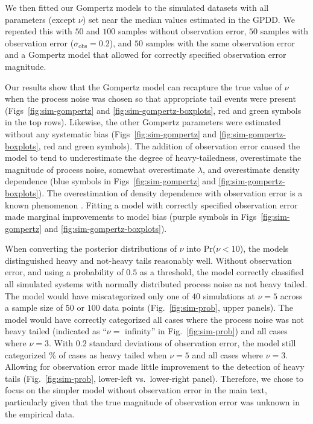 We then fitted our Gompertz models to the simulated datasets with all parameters (except $\nu$) set near the median values estimated in the GPDD. We repeated this with $50$ and $100$ samples without observation error, $50$ samples with observation error ($\sigma_\mathrm{obs} = 0.2$), and $50$ samples with the same observation error and a Gompertz model that allowed for correctly specified observation error magnitude.

Our results show that the Gompertz model can recapture the true value of $\nu$ when the process noise was chosen so that appropriate tail events were present (Figs~\ref{fig:sim-gompertz} and \ref{fig:sim-gompertz-boxplots}, red and green symbols in the top rows). Likewise, the other Gompertz parameters were estimated without any systematic bias (Figs~\ref{fig:sim-gompertz} and \ref{fig:sim-gompertz-boxplots}, red and green symbols). The addition of observation error caused the model to tend to underestimate the degree of heavy-tailedness, overestimate the magnitude of process noise, somewhat overestimate $\lambda$, and overestimate density dependence (blue symbols in Figs~\ref{fig:sim-gompertz} and \ref{fig:sim-gompertz-boxplots}). The overestimation of density dependence with observation error is a known phenomenon \citep{knape2012}. Fitting a model with correctly specified observation error made marginal improvements to model bias (purple symbols in Figs~\ref{fig:sim-gompertz} and \ref{fig:sim-gompertz-boxplots}).

When converting the posterior distributions of $\nu$ into Pr($\nu < 10$), the models distinguished heavy and not-heavy tails reasonably well. Without observation error, and using a probability of $0.5$ as a threshold, the model correctly classified all simulated systems with normally distributed process noise as not heavy tailed. The model would have miscategorized only one of $40$ simulations at $\nu = 5$ across a sample size of $50$ or $100$ data points (Fig.~\ref{fig:sim-prob}, upper panels). The model would have correctly categorized all cases where the process noise was not heavy tailed (indicated as ``$\nu =$ infinity'' in Fig.~\ref{fig:sim-prob}) and all cases where $\nu = 3$. With $0.2$ standard deviations of observation error, the model still categorized \obsErrorNuFivePerc\% of cases as heavy tailed when $\nu = 5$ and all cases where $\nu = 3$. Allowing for observation error made little improvement to the detection of heavy tails (Fig.~\ref{fig:sim-prob}, lower-left vs.\ lower-right panel). Therefore, we chose to focus on the simpler model without observation error in the main text, particularly given that the true magnitude of observation error was unknown in the empirical data.

